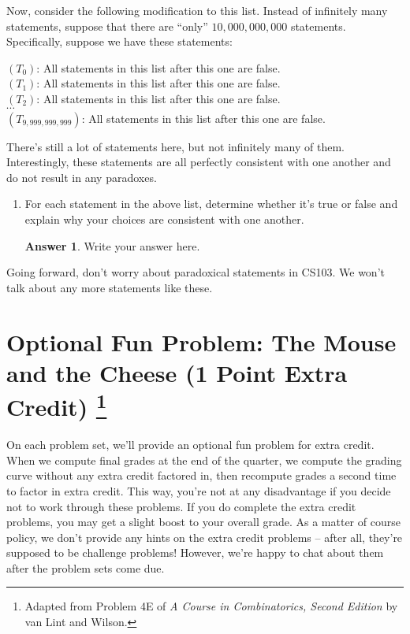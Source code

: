 \documentclass{article}
\renewcommand{\(}{\left(}
\renewcommand{\)}{\right)}
\theoremstyle{plain}
\theoremstyle{plain}
\theoremstyle{definition}
\newtheorem*{answer}{Answer}
\begin{document}
Now, consider the following modification to this list.
Instead of infinitely many statements,
suppose that there are ``only'' $10,000,000,000$ statements.
Specifically, suppose we have these statements:
\begin{center}
\begin{framed}
$(T_0)$: All statements in this list after this one are false. \\
$(T_1)$: All statements in this list after this one are false. \\
$(T_2)$: All statements in this list after this one are false. \\
$\cdots$ \\
$(T_{9,999,999,999})$: All statements in this list after this one are false.
\end{framed}
\end{center}
There's still a lot of statements here,
but not infinitely many of them.
Interestingly,
these statements are all perfectly consistent with one another and do not
result in any paradoxes.

\begin{enumerate}[resume*]

\item For each statement in the above list,
determine whether it's true or false and explain why
your choices are consistent with one another.

\begin{shaded}
\begin{answer}
Write your answer here.
\end{answer}
\end{shaded}

\end{enumerate}

Going forward, don't worry about paradoxical statements in CS103.
We won't talk about any more statements like these.
\smiley

\section*{Optional Fun Problem: The Mouse and the Cheese (1 Point Extra Credit)
\footnote{Adapted from Problem 4E of \emph{A Course in Combinatorics,
Second Edition} by van Lint and Wilson.}}

On each problem set,
we'll provide an optional fun problem for extra credit.
When we compute final grades
at the end of the quarter,
we compute the grading curve without any extra credit factored in,
then recompute
grades a second time to factor in extra credit.
This way, you're not at any disadvantage if
you decide not to work through these problems.
If you do complete the extra credit problems,
you may get a slight boost to your overall grade.
As a matter of course policy,
we don't provide any hints
on the extra credit problems -- after all,
they're supposed to be challenge problems!
However, we're happy to chat about them after the problem sets come due. \\
\end{document}
